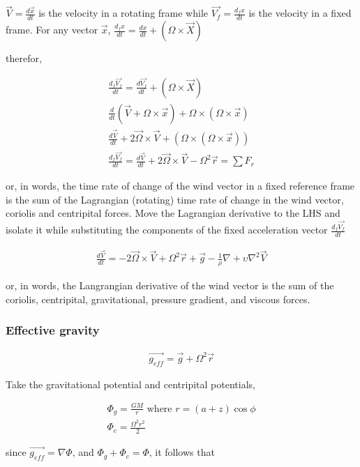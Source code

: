 \documentclass[a4paper,12pt]{article}
\begin{document}
$\vec{V} = \frac{d\vec{x}}{dt}$ is the velocity in a rotating frame while $\vec{V_f} = \frac{d_fx}{dt}$ is the velocity in a fixed frame.
For any vector $\vec{x}$,   $\frac{d_fx}{dt} = \frac{dx}{dt} + (\Omega \times \vec{X})$


therefor, 

\begin{align}
\frac{d_f\vec{V_f}}{dt} = \frac{d\vec{V_f}}{dt} + (\Omega \times \vec{X})\\
\frac{d}{dt}(\vec{V} + \Omega \times \vec{x}) + \Omega \times (\Omega \times \vec{x})\\
\frac{d\vec{V}}{dt} + 2\vec{\Omega} \times \vec{V} + (\Omega \times (\Omega \times \vec{x}))\\
\boxed{\frac{d_f\vec{V_f}}{dt} = \frac{d\vec{V}}{dt} + 2\vec{\Omega} \times \vec{V} - \Omega^2\vec{r} = \sum{F_r}}
\end{align}

or, in words, the time rate of change of the wind vector in a fixed reference frame is the sum of the Lagrangian (rotating) time rate of change in the wind vector, coriolis and centripital forces. Move the Lagrangian derivative to the LHS and isolate it while substituting the components of the fixed acceleration vector $\frac{d_f\vec{V_f}}{dt}$

\begin{align}
 \frac{d\vec{V}}{dt} = - 2\vec{\Omega} \times \vec{V} + \Omega^2\vec{r} + \vec{g} - \frac{1}{\rho}\nabla + \upsilon\nabla^2\vec{V}
\end{align}

or, in words, the Langrangian derivative of the wind vector is the sum of the coriolis, centripital, gravitational, pressure gradient, and viscous forces.

\subsubsection*{Effective gravity}
\begin{align}
\vec{g_{eff}} = \vec{g} + \Omega^2\vec{r} 
\end{align}

Take the gravitational potential and centripital potentials,

\begin{align}
\Phi_g = \frac{GM}{r} \text{ where } r = (a+z)\cos{\phi}\\
\Phi_c = \frac{\Omega^2r^2}{2}
\end{align}

since $\vec{g_{eff}} = \nabla \Phi$, and $\Phi_g + \Phi_c = \Phi$, it follows that
\end{document}
